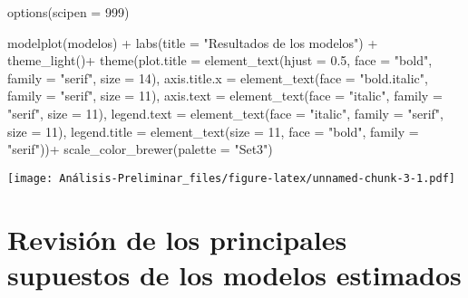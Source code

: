 \documentclass[
]{article}
\newenvironment{Shaded}{\begin{snugshade}}{\end{snugshade}}
\newcommand{\AttributeTok}[1]{\textcolor[rgb]{0.77,0.63,0.00}{#1}}
\newcommand{\DecValTok}[1]{\textcolor[rgb]{0.00,0.00,0.81}{#1}}
\newcommand{\FloatTok}[1]{\textcolor[rgb]{0.00,0.00,0.81}{#1}}
\newcommand{\FunctionTok}[1]{\textcolor[rgb]{0.00,0.00,0.00}{#1}}
\newcommand{\NormalTok}[1]{#1}
\newcommand{\OtherTok}[1]{\textcolor[rgb]{0.56,0.35,0.01}{#1}}
\newcommand{\SpecialCharTok}[1]{\textcolor[rgb]{0.00,0.00,0.00}{#1}}
\newcommand{\StringTok}[1]{\textcolor[rgb]{0.31,0.60,0.02}{#1}}
\begin{document}
\begin{Shaded}
\begin{Highlighting}[]
\FunctionTok{options}\NormalTok{(}\AttributeTok{scipen =} \DecValTok{999}\NormalTok{)}
 
\FunctionTok{modelplot}\NormalTok{(modelos) }\SpecialCharTok{+} \FunctionTok{labs}\NormalTok{(}\AttributeTok{title =} \StringTok{"Resultados de los modelos"}\NormalTok{) }\SpecialCharTok{+}
  \FunctionTok{theme\_light}\NormalTok{()}\SpecialCharTok{+}
  \FunctionTok{theme}\NormalTok{(}\AttributeTok{plot.title =} \FunctionTok{element\_text}\NormalTok{(}\AttributeTok{hjust =} \FloatTok{0.5}\NormalTok{, }\AttributeTok{face =} \StringTok{"bold"}\NormalTok{, }\AttributeTok{family =} \StringTok{"serif"}\NormalTok{, }\AttributeTok{size =} \DecValTok{14}\NormalTok{), }\AttributeTok{axis.title.x =} \FunctionTok{element\_text}\NormalTok{(}\AttributeTok{face =} \StringTok{"bold.italic"}\NormalTok{, }\AttributeTok{family =} \StringTok{"serif"}\NormalTok{, }\AttributeTok{size =} \DecValTok{11}\NormalTok{), }\AttributeTok{axis.text =} \FunctionTok{element\_text}\NormalTok{(}\AttributeTok{face =} \StringTok{"italic"}\NormalTok{, }\AttributeTok{family =} \StringTok{"serif"}\NormalTok{, }\AttributeTok{size =} \DecValTok{11}\NormalTok{), }\AttributeTok{legend.text =} \FunctionTok{element\_text}\NormalTok{(}\AttributeTok{face =} \StringTok{"italic"}\NormalTok{, }\AttributeTok{family =} \StringTok{"serif"}\NormalTok{, }\AttributeTok{size =} \DecValTok{11}\NormalTok{), }\AttributeTok{legend.title =} \FunctionTok{element\_text}\NormalTok{(}\AttributeTok{size =} \DecValTok{11}\NormalTok{, }\AttributeTok{face =} \StringTok{"bold"}\NormalTok{, }\AttributeTok{family =} \StringTok{"serif"}\NormalTok{))}\SpecialCharTok{+}
  \FunctionTok{scale\_color\_brewer}\NormalTok{(}\AttributeTok{palette =} \StringTok{"Set3"}\NormalTok{)}
\end{Highlighting}
\end{Shaded}

\texttt{[image: Análisis-Preliminar\_files/figure-latex/unnamed-chunk-3-1.pdf]}

\hypertarget{revisiuxf3n-de-los-principales-supuestos-de-los-modelos-estimados}{%
\section{Revisión de los principales supuestos de los modelos
estimados}\label{revisiuxf3n-de-los-principales-supuestos-de-los-modelos-estimados}}

\begin{Shaded}
\end{Shaded}
\end{document}
